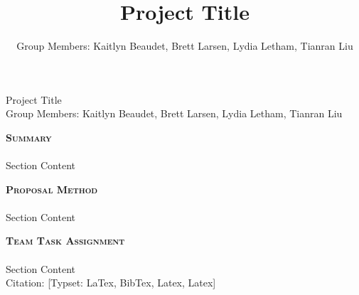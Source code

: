 \documentclass{article}[11pt]
\title{Project Title}
\author{Group Members: Kaitlyn Beaudet, Brett Larsen, Lydia Letham, Tianran Liu}
\date{}
\newcommand{\heading}[2]
{
\begin{center}
\huge{#1} \\
\normalsize {Group Members: #2}
\end{center}
}
\newcommand{\lineunder}{\vspace*{-2pt} \hspace*{-18pt} \hrulefill \\}
\newcommand{\header}[1]{\vspace*{10pt} \noindent \large \textbf{\textsc{#1}} \vspace*{-15pt} \\ \lineunder \normalsize}
\begin{document}
\doublespace

\heading{Project Title}{Kaitlyn Beaudet, Brett Larsen, Lydia Letham, Tianran Liu}

\header{Summary}
Section Content

\header{Proposal Method}
Section Content

\header{Team Task Assignment}
Section Content \\
Citation: \cite{Book1} [Typset: LaTex, BibTex, Latex, Latex] \\
\cite{Damarla2011,Larsen2013, Mehmood2012} \\



\end{document}
